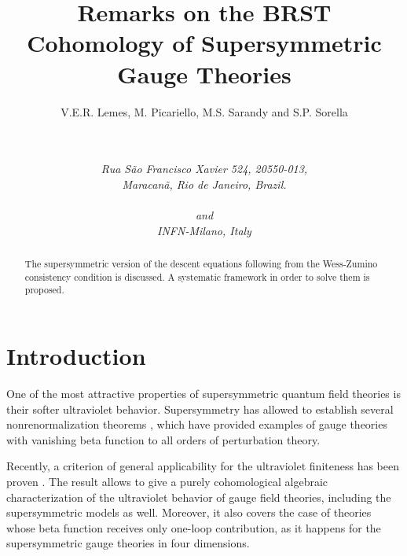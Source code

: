 \documentclass[a4paper,12pt]{article}
\def\Red{}%
\def\Black{}%
\def\Blue{}%
\begin{document}
\title{\Red\textbf{Remarks on the BRST Cohomology of Supersymmetric Gauge Theories \Black}%
\vspace{4mm}\bigskip }
\author{V.E.R. Lemes\coordHE{}, M. Picariello\coordHE{}, M.S. Sarandy\coordHE{} and S.P. Sorella\coordHE{} \and \textbf{\ }\vspace{3mm} \\
 \\
{\small {\textit{Rua S\~{a}o Francisco Xavier 524, 20550-013, }}}\\
{\small {\textit{Maracan\~{a}, Rio de Janeiro, Brazil.}}}\vspace{3mm}\\
\\
{\small {\textit{and }}}\\
{\small {\textit{INFN-Milano, Italy}}}}
\maketitle

\begin{abstract}\Blue
The supersymmetric version of the descent equations following from the
Wess-Zumino consistency condition is discussed. A systematic framework in
order to solve them is proposed. \ 
\Black
\newpage
\end{abstract}

\section{Introduction}

One of the most attractive properties of supersymmetric quantum field
theories is their softer ultraviolet behavior. Supersymmetry has allowed to
establish several nonrenormalization theorems \cite{nr}, which have provided
examples of gauge theories with vanishing beta function to all orders of
perturbation theory.

Recently, a criterion of general applicability for the ultraviolet
finiteness has been proven \cite{th}. The result allows to give a purely
cohomological algebraic characterization of the ultraviolet behavior of
gauge field theories, including the supersymmetric models as well. Moreover,
it also covers the case of theories whose beta function receives only
one-loop contribution, as it happens for the \myHighlight{$N=2$}\coordHE{} supersymmetric gauge
theories in four dimensions.
\end{document}
